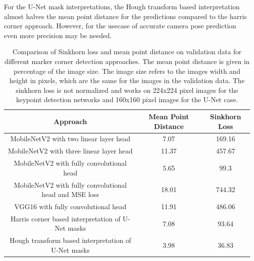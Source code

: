 \documentclass[10pt]{book}
\begin{document}
For the U-Net mask interpretations, the Hough transform based interpretation almost halves the mean point distance for the predictions compared to the harris corner approach. However, for the usecase of accurate camera pose prediction even more precision may be needed.

\begin{table}
  \begin{tabular}{ c c c }
   Approach & Mean Point Distance & Sinkhorn Loss \\ 
   \hline
   MobileNetV2 with two linear layer head        & 7.07 & 169.16 \\
   MobileNetV2 with three linear layer head      & 11.37 & 457.67 \\
   MobileNetV2 with fully convolutional head     & 5.65 & 99.3 \\
   MobileNetV2 with fully convolutional head and \ac{MSE} loss & 18.01 & 744.32 \\
   VGG16 with fully convolutional head           & 11.91 & 486.06 \\
   Harris corner based interpretation of U-Net masks    & 7.08 & 93.64 \\
   Hough transform based interpretation of U-Net masks  & 3.98 & 36.83 \\
   \hline
  \end{tabular}
  \caption{\label{tab:pet_valdata_results}Comparison of Sinkhorn loss and mean point distance on validation data for different marker corner detection approaches. The mean point distance is given in percentage of the image size. The image size refers to the images width and height in pixels, which are the same for the images in the validation data. The sinkhorn loss is not normalized and works on 224x224 pixel images for the keypoint detection networks and 160x160 pixel images for the U-Net case. }
\end{table}
\end{document}
